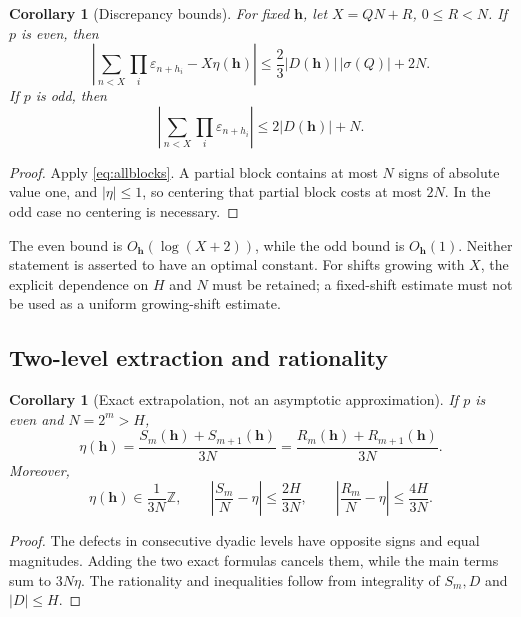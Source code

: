 \documentclass[11pt,oneside]{article}
\numberwithin{equation}{section}
\newtheorem{corollary}[theorem]{Corollary}
\theoremstyle{definition}
\theoremstyle{remark}
\newcommand{\eps}{\varepsilon}
\newcommand{\ZZ}{\mathbb Z}
\begin{document}
\begin{corollary}[Discrepancy bounds]
For fixed \(\bm h\), let \(X=QN+R\), \(0\le R<N\). If \(p\) is even, then
\begin{equation}
 \left|\sum_{n<X}\prod_i\eps_{n+h_i}-X\eta(\bm h)\right|
 \le \frac23|D(\bm h)|\,|\sigma(Q)|+2N.
 \label{eq:disc-even}
\end{equation}
If \(p\) is odd, then
\begin{equation}
 \left|\sum_{n<X}\prod_i\eps_{n+h_i}\right|
 \le 2|D(\bm h)|+N.
 \label{eq:disc-odd}
\end{equation}
\end{corollary}
\begin{proof}
Apply \eqref{eq:allblocks}. A partial block contains at most \(N\) signs of
absolute value one, and \(|\eta|\le1\), so centering that partial block costs
at most \(2N\). In the odd case no centering is necessary.
\end{proof}

The even bound is \(O_{\bm h}(\log(X+2))\), while the odd bound is
\(O_{\bm h}(1)\). Neither statement is asserted to have an optimal constant.
For shifts growing with \(X\), the explicit dependence on \(H\) and \(N\) must
be retained; a fixed-shift estimate must not be used as a uniform growing-shift
estimate.

\subsection{Two-level extraction and rationality}
\begin{corollary}[Exact extrapolation, not an asymptotic approximation]
If \(p\) is even and \(N=2^m>H\),
\begin{equation}
 \eta(\bm h)=\frac{S_m(\bm h)+S_{m+1}(\bm h)}{3N}
           =\frac{R_m(\bm h)+R_{m+1}(\bm h)}{3N}.
 \label{eq:twolevels}
\end{equation}
Moreover,
\begin{equation}
 \eta(\bm h)\in\frac1{3N}\ZZ,\qquad
 \left|\frac{S_m}N-\eta\right|\le\frac{2H}{3N},\qquad
 \left|\frac{R_m}N-\eta\right|\le\frac{4H}{3N}.
 \label{eq:ratbound}
\end{equation}
\end{corollary}
\begin{proof}
The defects in consecutive dyadic levels have opposite signs and equal
magnitudes. Adding the two exact formulas cancels them, while the main terms
sum to \(3N\eta\). The rationality and inequalities follow from integrality of
\(S_m,D\) and \(|D|\le H\).
\end{proof}
\end{document}
